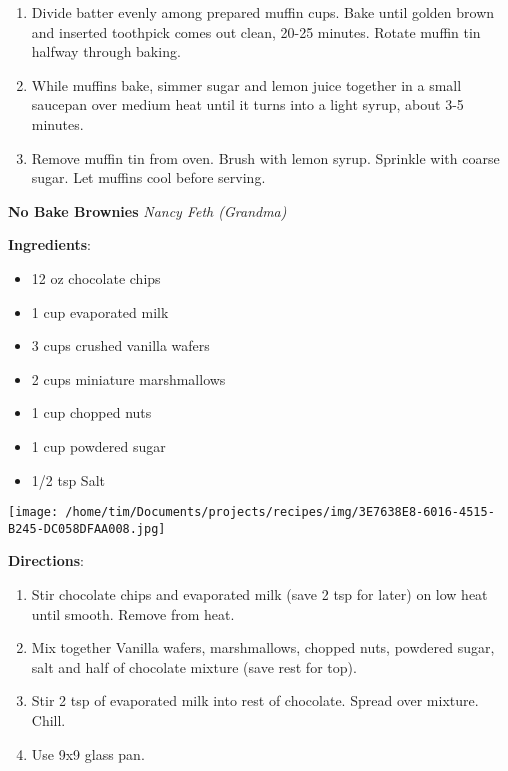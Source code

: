 \documentclass[11pt, twoside, openany]{book}
\begin{document}
\begin{minipage}[t]{\linewidth}
\begin{enumerate}
\item Divide batter evenly among prepared muffin cups. Bake until golden brown and inserted toothpick comes out clean, 20-25 minutes. Rotate muffin tin halfway through baking.
\item While muffins bake, simmer sugar and lemon juice together in a small saucepan over medium heat until it turns into a light syrup, about 3-5 minutes.
\item Remove muffin tin from oven. Brush with lemon syrup. Sprinkle with coarse sugar. Let muffins cool before serving.
\end{enumerate}
\end{minipage}\vspace{8mm}
\noindent\begin{minipage}[t]{\linewidth}%
{\Large\textbf{No Bake Brownies}} \label{no-bake-brownies}\hfill\textit{Nancy Feth (Grandma)}\\
\noindent\begin{minipage}[t]{0.78\linewidth}%
\textbf{Ingredients}:\vspace{-3mm}
\begin{multicols}{2}
\begin{itemize}\setlength\itemsep{-1mm}
\item 12 oz chocolate chips
\item 1 cup evaporated milk
\item 3 cups crushed vanilla wafers
\item 2 cups miniature marshmallows
\item 1 cup chopped nuts
\item 1 cup powdered sugar
\item 1/2 tsp Salt
\end{itemize}
\end{multicols}
\end{minipage}
\noindent\begin{minipage}[t]{0.18\linewidth}
\centering \strut\vspace*{-\baselineskip}\newline
\texttt{[image: /home/tim/Documents/projects/recipes/img/3E7638E8-6016-4515-B245-DC058DFAA008.jpg]}\\
\end{minipage}\vspace{3mm}
\textbf{Directions}:
\vspace{-3mm}\begin{enumerate}\setlength\itemsep{-1mm}
\item Stir chocolate chips and evaporated milk (save 2 tsp for later) on low heat until smooth. Remove from heat.
\item Mix together Vanilla wafers, marshmallows, chopped nuts, powdered sugar, salt and half of chocolate mixture (save rest for top).
\item Stir 2 tsp of evaporated milk into rest of chocolate. Spread over mixture. Chill.
\item Use 9x9 glass pan.
\end{enumerate}
\end{minipage}\vspace{8mm}
\end{document}
